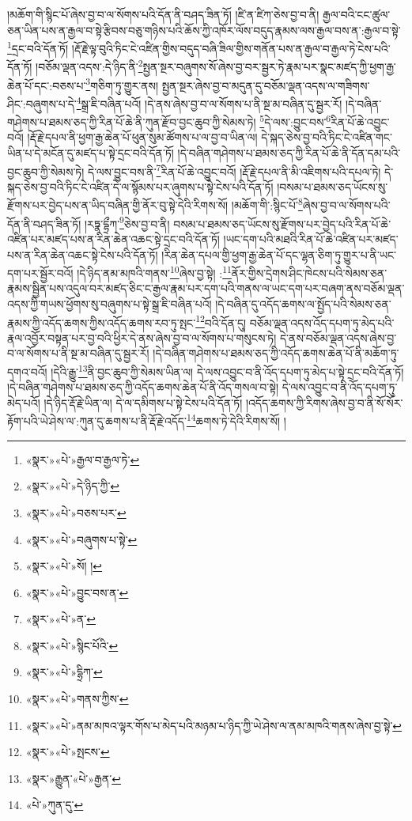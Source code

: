 །མཆོག་གི་སྙིང་པོ་ཞེས་བྱ་བ་ལ་སོགས་པའི་དོན་ནི་བཤད་ཟིན་ཏོ། །ཛི་ན་ཛིཀ་ཅེས་བྱ་བ་ནི། རྒྱལ་བའི་ངང་ཚུལ་ཅན་ཡིན་པས་ན་རྒྱལ་བ་སྟེ་རྩིབས་བཅུ་གཉིས་པའི་ཆོས་ཀྱི་འཁོར་ལོས་བདུད་རྣམས་ལས་རྒྱལ་བས་ན་:རྒྱལ་བ་སྟེ་\footnote{«སྣར་»«པེ་»རྒྱལ་བ་རྒྱལ་ཏེ་}དྲང་བའི་དོན་ཏོ། །རྡོ་རྗེ་ལྟ་བུའི་ཏིང་ངེ་འཛིན་གྱིས་བདུད་བཞི་ཟིལ་གྱིས་གནོན་པས་ན་རྒྱལ་བ་རྒྱལ་ཏེ་ངེས་པའི་དོན་ཏོ། །བཅོམ་ལྡན་འདས་:དེ་ཉིད་ནི་\footnote{«སྣར་»«པེ་»དེ་ཉིད་ཀྱི་}སྤྱན་སྔར་བཞུགས་སོ་ཞེས་བྱ་བར་སྦྱར་ཏེ་རྣམ་པར་སྣང་མཛད་ཀྱི་ཕྱག་རྒྱ་ཆེན་པོ་དང་:བཅས་པ་\footnote{«སྣར་»«པེ་»བཅས་པར་}གཅིག་ཏུ་གྱུར་ནས། སྤྱན་སྔར་ཞེས་བྱ་བ་མདུན་དུ་བཅོམ་ལྡན་འདས་ལ་གཟིགས་ཤིང་:བཞུགས་པ་དེ་\footnote{«སྣར་»«པེ་»བཞུགས་པ་སྟེ་}སྒྲ་ཇི་བཞིན་པའོ། །དེ་ནས་ཞེས་བྱ་བ་ལ་སོགས་པ་ནི་སྔ་མ་བཞིན་དུ་སྦྱར་རོ། །དེ་བཞིན་གཤེགས་པ་ཐམས་ཅད་ཀྱི་རིན་པོ་ཆེ་ནི་ཀུན་རྫོབ་བྱང་ཆུབ་ཀྱི་སེམས་ཏེ། \footnote{«སྣར་»«པེ་»སོ། ། }དེ་ལས་:བྱུང་བས་\footnote{«སྣར་»«པེ་»བྱུང་བས་ན་}རིན་པོ་ཆེ་འབྱུང་བའོ། །རྡོ་རྗེ་དཔལ་ནི་ཕྱག་རྒྱ་ཆེན་པོ་ཕུན་སུམ་ཚོགས་པ་ལ་བྱ་བ་ཡིན་ལ། དེ་སྐད་ཅེས་བྱ་བའི་ཏིང་ངེ་འཛིན་གང་ཡིན་པ་དེ་མངོན་དུ་མཛད་པ་སྟེ་དྲང་བའི་དོན་ཏོ། །དེ་བཞིན་གཤེགས་པ་ཐམས་ཅད་ཀྱི་རིན་པོ་ཆེ་ནི་དོན་དམ་པའི་བྱང་ཆུབ་ཀྱི་སེམས་ཏེ། དེ་ལས་བྱུང་བས་ནི་\footnote{«སྣར་»«པེ་»ན་}རིན་པོ་ཆེ་འབྱུང་བའོ། །རྡོ་རྗེ་དཔལ་ནི་མི་འཇིགས་པའི་དཔལ་ཏེ། དེ་སྐད་ཅེས་བྱ་བའི་ཏིང་ངེ་འཛིན་དེ་ལ་སྙོམས་པར་ཞུགས་པ་སྟེ་ངེས་པའི་དོན་ཏོ། །བསམ་པ་ཐམས་ཅད་ཡོངས་སུ་རྫོགས་པར་བྱེད་པས་ན་ཡིད་བཞིན་གྱི་ནོར་བུ་སྟེ་དེའི་རིགས་སོ། །མཆོག་གི་:སྙིང་པོ་\footnote{«སྣར་»«པེ་»སྙིང་པོའི་}ཞེས་བྱ་བ་ལ་སོགས་པའི་དོན་ནི་བཤད་ཟིན་ཏོ། །རཏྣ་དྷྲྀཀ་\footnote{«སྣར་»«པེ་»དྷྲིཀ་}ཅེས་བྱ་བ་ནི། བསམ་པ་ཐམས་ཅད་ཡོངས་སུ་རྫོགས་པར་བྱེད་པའི་རིན་པོ་ཆེ་འཛིན་པར་མཛད་པས་ན་རིན་ཆེན་འཆང་སྟེ་དྲང་བའི་དོན་ཏོ། །ཡང་དག་པའི་མཐའི་རིན་པོ་ཆེ་འཛིན་པར་མཛད་པས་ན་རིན་ཆེན་འཆང་སྟེ་ངེས་པའི་དོན་ཏོ། །རིན་ཆེན་དཔལ་གྱི་ཕྱག་རྒྱ་ཆེན་པོ་དང་ལྷན་ཅིག་ཏུ་གྱུར་པ་ནི་ཡང་དག་པར་སྦྱོར་བའོ། །དེ་ཉིད་ནམ་མཁའི་གནས་\footnote{«སྣར་»«པེ་»གནས་ཀྱིས་}ཞེས་བྱ་སྟེ། :\footnote{«སྣར་»«པེ་»ནམ་མཁའ་ལྟར་གོས་པ་མེད་པའི་མཉམ་པ་ཉིད་ཀྱི་ཡེ་ཤེས་ལ་ནམ་མཁའི་གནས་ཞེས་བྱ་སྟེ་}ནོར་གྱིས་དྲེགས་ཤིང་ཁེངས་པའི་སེམས་ཅན་རྣམས་སྦྱིན་པས་འདུལ་བར་མཛད་ཅིང་ང་རྒྱལ་རྣམ་པར་དག་པའི་གནས་ལ་ཡང་དག་པར་བཞག་ནས་བཅོམ་ལྡན་འདས་ཀྱི་གཡས་ཕྱོགས་སུ་བཞུགས་པ་སྟེ་སྒྲ་ཇི་བཞིན་པའོ། །དེ་བཞིན་དུ་འདོད་ཆགས་ལ་སྤྱོད་པའི་སེམས་ཅན་རྣམས་ཀྱི་འདོད་ཆགས་ཀྱིས་འདོད་ཆགས་རབ་ཏུ་སྤང་\footnote{«སྣར་»«པེ་»སྤངས་}བའི་དོན་དུ། བཅོམ་ལྡན་འདས་འོད་དཔག་ཏུ་མེད་པའི་རྣལ་འབྱོར་བསྟན་པར་བྱ་བའི་ཕྱིར་དེ་ནས་ཞེས་བྱ་བ་ལ་སོགས་པ་གསུངས་ཏེ། དེ་ནས་བཅོམ་ལྡན་འདས་ཞེས་བྱ་བ་ལ་སོགས་པ་ནི་སྔ་མ་བཞིན་དུ་སྦྱར་རོ། །དེ་བཞིན་གཤེགས་པ་ཐམས་ཅད་ཀྱི་འདོད་ཆགས་ཆེན་པོ་ནི་མཆོག་ཏུ་དགའ་བའོ། །དེའི་རྒྱུ་\footnote{«སྣར་»རྒྱུན་«པེ་»རྒྱན་}ནི་བྱང་ཆུབ་ཀྱི་སེམས་ཡིན་ལ། དེ་ལས་འབྱུང་བ་ནི་འོད་དཔག་ཏུ་མེད་པ་སྟེ་དྲང་བའི་དོན་ཏོ། །དེ་བཞིན་གཤེགས་པ་ཐམས་ཅད་ཀྱི་འདོད་ཆགས་ཆེན་པོ་ནི་འོད་གསལ་བ་སྟེ། དེ་ལས་འབྱུང་བ་ནི་འོད་དཔག་ཏུ་མེད་པའོ། །དེ་ཉིད་རྡོ་རྗེ་ཡིན་ལ། དེ་ལ་དམིགས་པ་སྟེ་ངེས་པའི་དོན་ཏོ། །འདོད་ཆགས་ཀྱི་རིགས་ཞེས་བྱ་བ་ནི་སོ་སོར་རྟོག་པའི་ཡེ་ཤེས་ལ་:ཀུན་དུ་ཆགས་པ་ནི་རྡོ་རྗེ་འདོད་\footnote{«པེ་»ཀུན་དུ་}ཆགས་ཏེ་དེའི་རིགས་སོ། །
